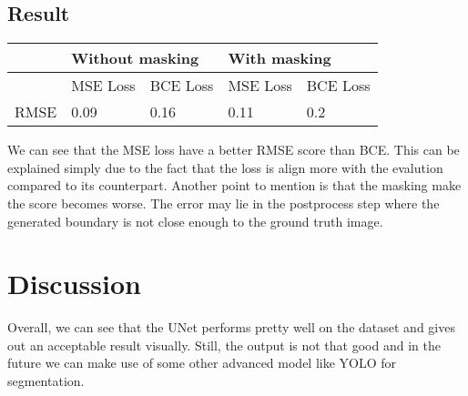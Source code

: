 \documentclass{article}
\begin{document}
\subsection{Result}
\begin{table}[]
    \centering
    \begin{tabular}{|l|ll|ll|}
    \hline
         & \multicolumn{2}{l|}{Without masking}     & \multicolumn{2}{l|}{With masking}        \\ \hline
         & \multicolumn{1}{l|}{MSE Loss} & BCE Loss & \multicolumn{1}{l|}{MSE Loss} & BCE Loss \\ \hline
    RMSE & \multicolumn{1}{l|}{0.09}     & 0.16     & \multicolumn{1}{l|}{0.11}     & 0.2      \\ \hline
    \end{tabular}
    \end{table}

\noindent We can see that the MSE loss have a better RMSE score than BCE.
This can be explained simply due to the fact that the loss is align more with
the evalution compared to its counterpart. Another point to mention is that
the masking make the score becomes worse. The error may lie in the postprocess
step where the generated boundary is not close enough to the ground truth image.

\section{Discussion}
Overall, we can see that the UNet performs pretty well on the dataset and gives
out an acceptable result visually. Still, the output is not that good and in the future
we can make use of some other advanced model like YOLO for segmentation.
\end{document}
